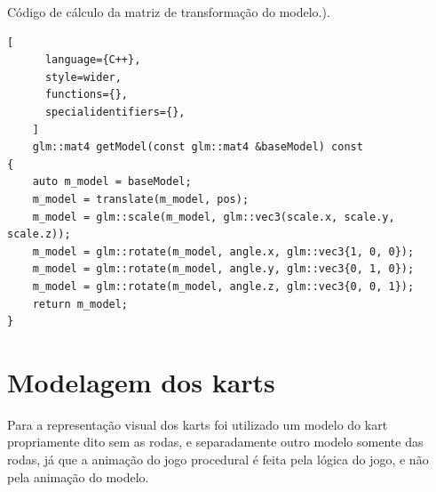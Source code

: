 \begin{programruledcaption}{Código de cálculo da matriz de transformação do modelo.).\label{prog:model}}
    \begin{lstlisting}[
      language={C++},
      style=wider,
      functions={},
      specialidentifiers={},
    ]
    glm::mat4 getModel(const glm::mat4 &baseModel) const
{
    auto m_model = baseModel;
    m_model = translate(m_model, pos);
    m_model = glm::scale(m_model, glm::vec3(scale.x, scale.y, scale.z));
    m_model = glm::rotate(m_model, angle.x, glm::vec3{1, 0, 0});
    m_model = glm::rotate(m_model, angle.y, glm::vec3{0, 1, 0});
    m_model = glm::rotate(m_model, angle.z, glm::vec3{0, 0, 1});
    return m_model;
}
    \end{lstlisting}
\end{programruledcaption}

\section{Modelagem dos karts}

Para a representação visual dos karts foi utilizado um modelo do kart propriamente dito sem as rodas, e separadamente outro modelo somente das rodas, já que a animação do jogo procedural é feita pela lógica do jogo, e não pela animação do modelo.

